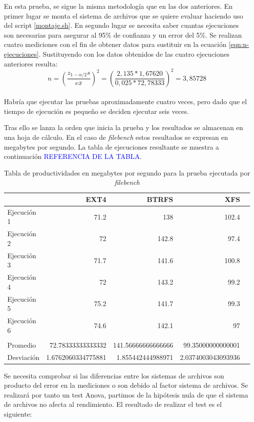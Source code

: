En esta prueba, se sigue la misma metodología que en las dos anteriores. En primer lugar se monta el sistema de archivos que se quiere evaluar haciendo uso del script \ref{montaje.sh}. En segundo lugar se necesita saber cuantas ejecuciones son necesarias para asegurar al 95\% de confianza y un error del 5\%. Se realizan cuatro mediciones con el fin de obtener datos para sustituir en la ecuación \ref{eqn:n-ejecuciones}. Sustituyendo con los datos obtenidos de las cuatro ejecuciones anteriores resulta: $$
n=\left(\frac{z_{1-\alpha / 2} s}{e \bar{x}}\right)^{2} = \left(\frac{2,135*1,67620}{0,025*72,78333}\right)^{2} = 3,85728
$$\\

Habría que ejecutar las pruebas aproximadamente cuatro veces, pero dado que el tiempo de ejecución es pequeño se deciden ejecutar seis veces.

Tras ello se lanza la orden que inicia la prueba y los resultados se almacenan en una hoja de cálculo. En el caso de \textit{filebench} estos resultados se expresan en megabytes por segundo. La tabla de ejecuciones resultante se muestra a continuación \textcolor{blue}{REFERENCIA DE LA TABLA}.
 
\begin{table}[!htp]\centering
\scriptsize
\begin{tabular}{lrrrr}\toprule
&EXT4 &BTRFS &XFS \\\midrule
Ejecución 1 &71.2 &138 &102.4 \\
Ejecución 2 &72 &142.8 &97.4 \\
Ejecución 3 &71.7 &141.6 &100.8 \\
Ejecución 4 &72 &143.2 &99.2 \\
Ejecución 5 &75.2 &141.7 &99.3 \\
Ejecución 6 &74.6 &142.1 &97 \\
& & & \\
Promedio &72.78333333333332 &141.56666666666666 &99.35000000000001 \\
Desviación &1.6762060334775881 &1.855442444988971 &2.0374003043093936 \\
\bottomrule
\end{tabular}
\caption{Tabla de productividades en megabytes por segundo para la prueba ejecutada por \textit{filebench}}\label{tab:filebench_tabla}
\end{table}

Se necesita comprobar si las diferencias entre los sistemas de archivos son producto del error en la mediciones o son debido al factor sistema de archivos. Se realizará por tanto un test Anova, partimos de la hipótesis nula de que el sistema de archivos no afecta al rendimiento. El resultado de realizar el test es el siguiente: 

